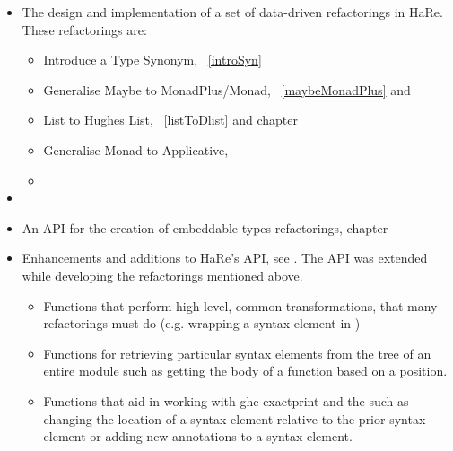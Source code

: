 \begin{itemize}
\item The design and implementation of a set of data-driven refactorings in HaRe. These refactorings are:
	\begin{itemize}
		\item Introduce a Type Synonym, \DIFdelbegin {}\DIFdelend \DIFaddbegin {}\DIFaddend ~\ref{introSyn}
		\item Generalise Maybe to MonadPlus/Monad, \DIFdelbegin {}\DIFdelend \DIFaddbegin {}\DIFaddend ~\ref{maybeMonadPlus} and \DIFdelbegin {}\DIFdelend \DIFaddbegin {}\DIFaddend \item List to Hughes List, \DIFdelbegin {}\DIFdelend \DIFaddbegin {}\DIFaddend ~\ref{listToDlist} and chapter~\DIFdelbegin \DIFdel{\ref{generalImp}
		}\DIFdelend \DIFaddbegin \DIFadd{\ref{chp:generalImp}
		}\DIFaddend \item Generalise Monad to Applicative, \DIFdelbegin {}%
\item%
\DIFdelend \DIFaddbegin {}\DIFaddend \end{itemize}
\item \DIFaddbegin {}\item \DIFaddend An API for the creation of embeddable types refactorings, chapter~\DIFdelbegin \DIFdel{\ref{generalImp}
}\DIFdelend \DIFaddbegin \DIFadd{\ref{chp:generalImp}
}\DIFaddend \item Enhancements and additions to HaRe's API, see \DIFdelbegin {}\DIFdelend \DIFaddbegin {}\DIFaddend . The API was extended while developing the refactorings mentioned above.
\begin{itemize}
	\item Functions that perform high level, common transformations, that many refactorings must do (e.g. wrapping a syntax element in \DIFdelbegin {}\DIFdelend \DIFaddbegin {}\DIFaddend )
	\item Functions for retrieving particular syntax elements from the \DIFaddbegin {}\DIFaddend tree of an entire module such as getting the body of a function based on a position. 
	\item Functions that aid in working with ghc-exactprint and the \DIFdelbegin {}\DIFdelend \DIFaddbegin {}\DIFaddend such as changing the location of a syntax element relative to the prior syntax element or adding new annotations to a syntax element.
\end{itemize}	  
\end{itemize}
\DIFaddbegin 

